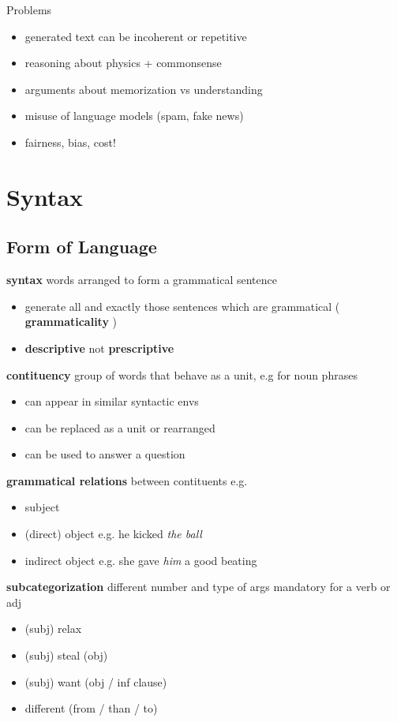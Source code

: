 \documentclass[]{article}
\theoremstyle{definition}
\begin{document}
Problems
\begin{itemize}
    \item generated text can be incoherent or repetitive
    \item reasoning about physics + commonsense
    \item arguments about memorization vs understanding
    \item misuse of language models (spam, fake news)
    \item fairness, bias, cost!
\end{itemize}

\section{Syntax}%
\label{sec:syntax}

\subsection{Form of Language}%
\label{sub:form_of_language}


\textbf{syntax} words arranged to form a grammatical sentence
\begin{itemize}
    \item generate all and exactly those sentences which are grammatical ( \textbf{grammaticality} )
    \item \textbf{descriptive} not \textbf{prescriptive}
\end{itemize}

\textbf{contituency} group of words that behave as a unit, e.g for noun phrases
\begin{itemize}
    \item can appear in similar syntactic envs
    \item can be replaced as a unit or rearranged
    \item can be used to answer a question
\end{itemize}
\textbf{grammatical relations} between contituents e.g.
\begin{itemize}
    \item subject
    \item (direct) object e.g. he kicked \textit{the ball}
    \item indirect object e.g. she gave \textit{him} a good beating
\end{itemize}
\textbf{subcategorization} different number and type of args mandatory for a verb or adj
\begin{itemize}
    \item (subj) relax
    \item (subj) steal (obj)
    \item (subj) want (obj / inf clause)
    \item different (from / than / to)
\end{itemize}
\end{document}
